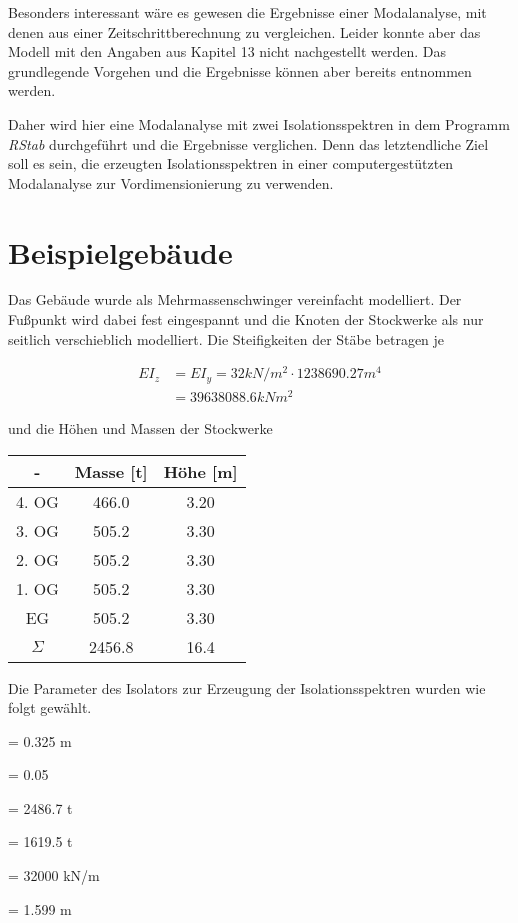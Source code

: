 Besonders interessant wäre es gewesen die Ergebnisse einer Modalanalyse, mit denen aus einer Zeitschrittberechnung zu vergleichen. Leider konnte aber das Modell mit den Angaben aus Kapitel 13 \cite{Isemann} nicht nachgestellt werden.
Das grundlegende Vorgehen und die Ergebnisse können aber bereits entnommen werden.

Daher wird hier eine Modalanalyse mit zwei Isolationsspektren in dem Programm \emph{RStab} durchgeführt und die Ergebnisse verglichen. Denn das letztendliche Ziel soll es sein, die erzeugten Isolationsspektren in einer computergestützten Modalanalyse zur Vordimensionierung zu verwenden.

\pagebreak

\section{Beispielgebäude}
\label{sec:besipielgebaude}

Das Gebäude wurde als Mehrmassenschwinger vereinfacht modelliert. Der Fußpunkt wird dabei fest eingespannt und die Knoten der Stockwerke als nur seitlich verschieblich modelliert. Die Steifigkeiten der Stäbe betragen je

\begin{align*}
EI_z &= EI_y = 32 kN/m^2 \cdot 1238690.27 m^4\\
     &= 39638088.6 kNm^2
\end{align*}

und die Höhen und Massen der Stockwerke

\begin{table}[H]
\centering
\begin{tabular}{ |c|c|c| } 
 \hline
 - & Masse [t] & Höhe [m]\\
 \hline\hline
4. OG & 466.0 & 3.20\\
3. OG & 505.2 & 3.30\\
2. OG & 505.2 & 3.30\\
1. OG & 505.2 & 3.30\\
EG    & 505.2 & 3.30\\
 \hline \hline
$\Sigma$ & 2456.8 & 16.4\\
\hline
\end{tabular}
\end{table}

Die Parameter des Isolators zur Erzeugung der Isolationsspektren wurden wie folgt gewählt.

    = 0.325 m \par
\makebox[1cm]{$\mu$}  = 0.05\par
{}  = 2486.7 t\par
{}  = 1619.5 t\par
{}  = 32000 kN/m \par
{}    = 1.599 m\par

